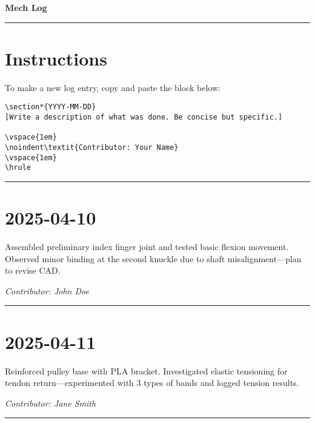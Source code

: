 \documentclass[12pt]{article}
\begin{document}
\begin{center}
    {\Huge\bfseries Mech Log}
\end{center}
\vspace{1em}
\hrule
\vspace{1em}

\section*{Instructions}
To make a new log entry, copy and paste the block below:

\begin{verbatim}
\section*{YYYY-MM-DD}
[Write a description of what was done. Be concise but specific.]

\vspace{1em}
\noindent\textit{Contributor: Your Name}
\vspace{1em}
\hrule
\end{verbatim}

\vspace{1em}
\hrule
\vspace{1em}


\section*{2025-04-10}
Assembled preliminary index finger joint and tested basic flexion movement. Observed minor binding at the second knuckle due to shaft misalignment—plan to revise CAD.

\vspace{1em}
\noindent\textit{Contributor: John Doe}
\vspace{1em}
\hrule

\section*{2025-04-11}
Reinforced pulley base with PLA bracket. Investigated elastic tensioning for tendon return—experimented with 3 types of bands and logged tension results.

\vspace{1em}
\noindent\textit{Contributor: Jane Smith}
\vspace{1em}
\hrule

\end{document}
